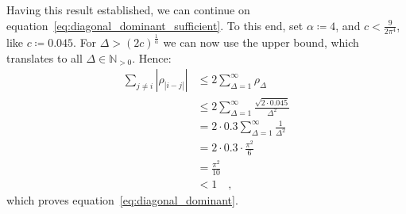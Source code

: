 \documentclass[../../main.tex]{subfiles}
\begin{document}
Having this result established, we can continue on equation~\eqref{eq:diagonal_dominant_sufficient}. To this end, set $\alpha \coloneqq 4$, and $c < \frac{9}{2 \pi^4}$, like $c \coloneqq 0.045$. For $\Delta > (2c)^{\frac{1}{\alpha}}$ we can now use the upper bound, which translates to all $\Delta \in \mathbb{N}_{>0}$. Hence:
\begin{align*}
    \sum_{j \neq i} |\rho_{|i-j|}| &\leq 2 \sum_{\Delta = 1}^{\infty} \rho_\Delta \\
    &\leq 2 \sum_{\Delta = 1}^{\infty} \frac{\sqrt{2 \cdot 0.045}}{\Delta^2} \\
    &= 2 \cdot 0.3 \sum_{\Delta = 1}^{\infty} \frac{1}{\Delta^2} \\
    &= 2 \cdot 0.3 \cdot \frac{\pi^2}{6} \\
    &= \frac{\pi^2}{10} \\
    &< 1 \quad ,
\end{align*}
which proves equation~\eqref{eq:diagonal_dominant}.
\end{document}
